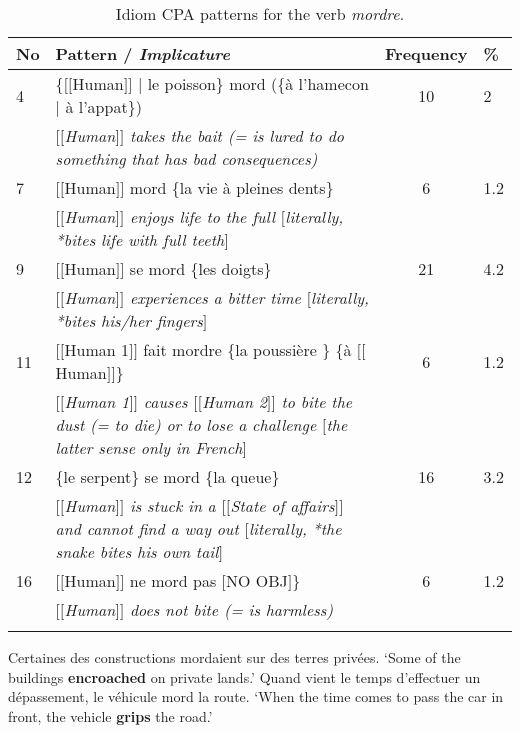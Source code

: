 \documentclass[output=paper]{langsci/langscibook}
\begin{document}
\begin{table}[H]
\small
\begin{tabular}{p{8mm}p{7.5cm} c p{1cm}}
\lsptoprule
No & Pattern / \textit{Implicature} & Frequency & \%\\
\midrule
4 & \{$[$$[$Human$]$$]$ | le poisson\} mord (\{à l'hamecon | à l'appat\}) & 10 & 2\\
 & \textit{$[$$[$Human$]$$]$ takes the bait (= is lured to do something that has bad consequences)} & & \\
7 & $[$$[$Human$]$$]$ mord \{la vie à pleines dents\} & 6 & 1.2\\
 & \textit{$[$$[$Human$]$$]$ enjoys life to the full $[$literally, *bites life with full teeth$]$} & & \\
9 & $[$$[$Human$]$$]$ se mord \{les doigts\} & 21 & 4.2\\
 & \textit{$[$$[$Human$]$$]$ experiences a bitter time $[$literally, *bites his/her fingers$]$} &  & \\
11 & $[$$[$Human 1$]$$]$ fait mordre \{la poussière \} \{à $[$$[$Human$]$$]$\} & 6 & 1.2\\
 & \textit{$[$$[$Human 1$]$$]$ causes $[$$[$Human 2$]$$]$ to bite the dust (= to die) or to lose a challenge $[$the latter sense only in French$]$} &  & \\
12 & \{le serpent\} se mord \{la queue\} & 16 & 3.2\\
 & \textit{$[$$[$Human$]$$]$ is stuck in a $[$$[$State of affairs$]$$]$ and cannot find a way out $[$literally, *the snake bites his own tail$]$} &  & \\
16 & $[$$[$Human$]$$]$ ne mord pas $[$NO OBJ$]$\} &
6 & 1.2\\
 &
\textit{$[$$[$Human$]$$]$ does not bite (= is harmless)} &
 &
\\
\lspbottomrule
\end{tabular}
\caption{Idiom CPA patterns for the verb \textit{mordre}.}
\label{idiom cpa mordre}
\end{table}



\ea
\label{ex14}
Certaines des constructions mordaient sur des terres privées.
\glt `Some of the buildings \textbf{encroached} on private lands.'
\ex \label{ex15}
Quand vient le temps d'effectuer un dépassement, le véhicule mord
la route.
\glt `When the time comes to pass the car in front, the vehicle \textbf{grips} the road.'
\z
\end{document}
